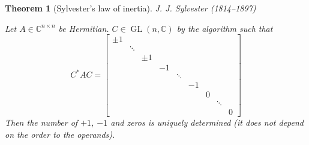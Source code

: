 \documentclass{article}
\newtheorem{theorem}{Theorem}  \numberwithin{theorem}{section}
\begin{document}
\begin{theorem}[Sylvester's law of inertia]
  J. J. Sylvester (1814--1897)

  Let $A \in \mathbb C^{n\times n}$ be Hermitian.
  $C \in \operatorname{GL}(n, \mathbb C)$ by the algorithm
  such that
  \[ C^* AC = \begin{bmatrix}
    \pm 1 &        &       &    &        &    &   &        & \\
          & \ddots &       &    &        &    &   &        & \\
          &        & \pm 1 &    &        &    &   &        & \\
          &        &       & -1 &        &    &   &        & \\
          &        &       &    & \ddots &    &   &        & \\
          &        &       &    &        & -1 &   &        & \\
          &        &       &    &        &    & 0 &        & \\
          &        &       &    &        &    &   & \ddots & \\
          &        &       &    &        &    &   &        & 0
    \end{bmatrix}
  \]
  Then the number of $+1$, $-1$ and zeros is uniquely determined
  (it does not depend on the order to the operands).
\end{theorem}
\end{document}
